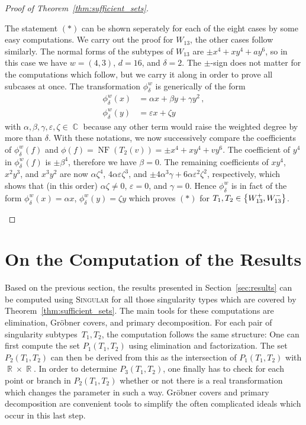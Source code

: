 \documentclass{amsproc}
\theoremstyle{definition}
\let\originalleft\left
\let\originalright\right
\renewcommand{\left}{\mathopen{}\mathclose\bgroup\originalleft}
\renewcommand{\right}{\aftergroup\egroup\originalright}
\newcommand{\Singular}{\textsc{Singular}}
\DeclareMathOperator{\R}{\mathbb{R}}
\DeclareMathOperator{\C}{\mathbb{C}}
\DeclareMathOperator{\NF}{NF}
\begin{document}
\begin{proof}[Proof of Theorem~\ref{thm:sufficient_sets}]
\begin{description}[font=\normalfont\itshape,%
leftmargin=0cm,labelindent=\parindent]
The statement $(\ast)$ can be shown seperately for each of the eight cases by
some easy computations. We carry out the proof for $W_{13}$, the other cases
follow similarly. The normal forms of the subtypes of $W_{13}$ are
$\pm x^4+xy^4+ay^6$, so in this case we have $w = (4,3)$, $d = 16$, and
$\delta = 2$. The $\pm$-sign does not matter for the computations which follow,
but we carry it along in order to prove all subcases at once. The
transformation $\phi_\delta^w$ is generically of the form
\begin{align*}
\phi_\delta^w(x) &= \alpha x + \beta y + \gamma y^2 \,, \\
\phi_\delta^w(y) &= \varepsilon x + \zeta y
\end{align*}
with $\alpha, \beta, \gamma, \varepsilon, \zeta \in \C$ because any other term
would raise the weighted degree by more than $\delta$. With these notations, we
now successively compare the coefficients of $\phi_\delta^w(f)$ and
$\phi(f) = \NF(T_2(v)) = \pm x^4+xy^4+vy^6$. The coefficient of $y^4$ in
$\phi_\delta^w(f)$ is $\pm \beta^4$, therefore we have $\beta = 0$. The
remaining coefficients of $xy^4$, $x^2y^3$, and $x^3y^2$ are now
$\alpha\zeta^4$, $4\alpha\varepsilon\zeta^3$, and
$\pm 4\alpha^3\gamma+6\alpha\varepsilon^2\zeta^2$, respectively, which shows
that (in this order) $\alpha\zeta \neq 0$, $\varepsilon = 0$, and $\gamma = 0$.
Hence $\phi_\delta^w$ is in fact of the form $\phi_\delta^w(x) = \alpha x$,
$\phi_\delta^w(y) = \zeta y$ which proves $(\ast)$ for
$T_1, T_2 \in \left\{W_{13}^+, W_{13}^-\right\}$.
\end{description}
\end{proof}


\section{On the Computation of the Results}\label{sec:computations}

Based on the previous section, the results presented in
Section~\ref{sec:results} can be computed using \Singular{} for all those
singularity types which are covered by Theorem~\ref{thm:sufficient_sets}. The
main tools for these computations are elimination, Gr\"obner covers, and
primary decomposition. For each pair of singularity subtypes~$T_1, T_2$, the
computation follows the same structure: One can first compute the set
$P_1(T_1, T_2)$ using elimination and factorization. The set $P_2(T_1, T_2)$
can then be derived from this as the intersection of $P_1(T_1, T_2)$ with
$\R \times \R$. In order to determine $P_3(T_1, T_2)$, one finally has to check
for each point or branch in $P_2(T_1, T_2)$ whether or not there is a real
transformation which changes the parameter in such a way. Gr\"obner covers and
primary decomposition are convenient tools to simplify the often complicated
ideals which occur in this last step.
\end{document}

